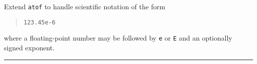 \documentclass{article}
\begin{document}
Extend \texttt{atof} to handle scientific notation of the form
\begin{quote}
  \texttt{123.45e-6}
\end{quote}
where a floating-point number may be followed by \texttt{e} or
\texttt{E} and an optionally signed exponent.
\vspace{2cm} \hrule
\end{document}
